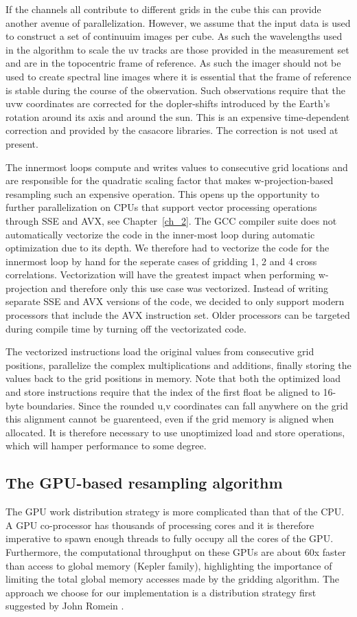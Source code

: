 If the channels all contribute to different grids in the cube this can provide another avenue of parallelization. However, we assume that the input data is used to
construct a set of continuuim images per cube. As such the wavelengths used in the algorithm to scale the uv tracks are those provided in the measurement set and are in the topocentric
frame of reference. As such the imager should not be used to create spectral line images where it is essential that the frame of reference is stable during the course of the observation.
Such observations require that the uvw coordinates are corrected for the dopler-shifts introduced by the Earth's rotation around its axis and around the sun. This is an expensive time-dependent
correction and provided by the casacore libraries. The correction is not used at present.

The innermost loops compute and writes values to consecutive grid locations and are responsible for the quadratic scaling factor that makes w-projection-based resampling such an expensive operation. 
This opens up the opportunity to further parallelization on CPUs that support vector processing operations through SSE and AVX, see Chapter~\ref{ch_2}. The GCC compiler suite does not automatically vectorize the code in the inner-most 
loop during automatic optimization due to its depth. We therefore had to vectorize the code for the innermost loop by hand for the seperate cases of gridding 1, 2 and 4 cross correlations. Vectorization will have
the greatest impact when performing w-projection and therefore only this use case was vectorized. Instead of writing separate SSE and AVX versions of the code, we decided to only support modern processors that include the 
AVX instruction set. Older processors can be targeted during compile time by turning off the vectorizated code.

The vectorized instructions load the original values from consecutive grid positions, parallelize the complex multiplications and additions, finally storing the values back to the grid positions in memory. Note that 
both the optimized load and store instructions require that the index of the first float be aligned to 16-byte boundaries. Since the rounded u,v coordinates can fall anywhere on the grid this alignment cannot be guarenteed,
even if the grid memory is aligned when allocated. It is therefore necessary to use unoptimized load and store operations, which will hamper performance to some degree.

\subsection{The GPU-based resampling algorithm}
The GPU work distribution strategy is more complicated than that of the CPU. A GPU co-processor has thousands of processing cores and it is therefore imperative to spawn enough threads to fully
occupy all the cores of the GPU. Furthermore, the computational throughput on these GPUs are about 60x faster \cite{kepler} than access to global memory (Kepler family), highlighting the importance of 
limiting the total global memory accesses made by the gridding algorithm. The approach we choose for our implementation is a distribution strategy first
suggested by John Romein \cite{romein2012efficient}.

